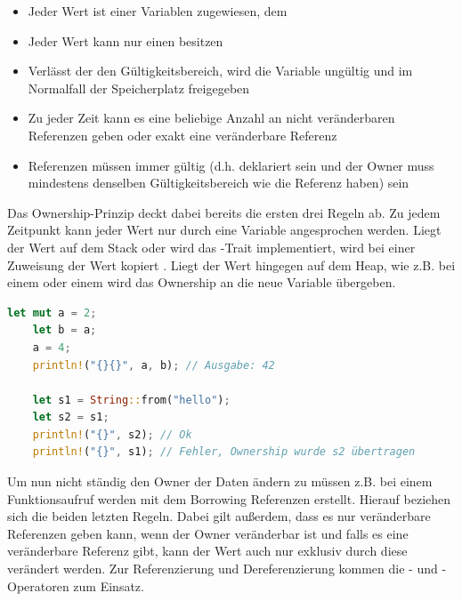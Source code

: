 \documentclass[11pt,a4paper, ngerman]{article}
\begin{document}
\begin{itemize}
    \item Jeder Wert ist einer Variablen zugewiesen, dem 
    \item Jeder Wert kann nur einen  besitzen
    \item Verlässt der  den Gültigkeitsbereich, wird die Variable ungültig und im Normalfall der Speicherplatz freigegeben
    \item Zu jeder Zeit kann es eine beliebige Anzahl an nicht veränderbaren Referenzen geben oder exakt eine veränderbare Referenz
    \item Referenzen müssen immer gültig (d.h. deklariert sein und der Owner muss mindestens denselben Gültigkeitsbereich wie die Referenz haben) sein
\end{itemize}

Das Ownership-Prinzip deckt dabei bereits die ersten drei Regeln ab. Zu jedem Zeitpunkt kann jeder Wert nur durch eine Variable angesprochen werden. Liegt der Wert auf dem Stack oder wird das -Trait implementiert, wird bei einer Zuweisung der Wert kopiert \cite{CopyTraitOwner}. Liegt der Wert hingegen auf dem Heap, wie z.B. bei einem  oder einem  wird das Ownership an die neue Variable übergeben.

\begin{lstlisting}[language=rust, caption={ownership}]
    let mut a = 2;
    let b = a;
    a = 4;
    println!("{}{}", a, b); // Ausgabe: 42

    let s1 = String::from("hello");
    let s2 = s1;
    println!("{}", s2); // Ok
    println!("{}", s1); // Fehler, Ownership wurde s2 übertragen
\end{lstlisting}

Um nun nicht ständig den Owner der Daten ändern zu müssen z.B. bei einem Funktionsaufruf werden mit dem Borrowing Referenzen erstellt. Hierauf beziehen sich die beiden letzten Regeln. Dabei gilt außerdem, dass es nur veränderbare Referenzen geben kann, wenn der Owner veränderbar ist und falls es eine veränderbare Referenz gibt, kann der Wert auch nur exklusiv durch diese verändert werden. Zur Referenzierung und Dereferenzierung kommen die \codeword{&}- und \codeword{*}-Operatoren zum Einsatz.
\end{document}
